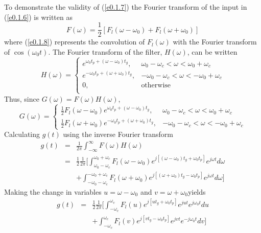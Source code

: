 	To demonstrate the validity of (\ref{e0.1.7}) the Fourier transform
of the input in (\ref{e0.1.6}) is written as
%
\begin{equation}
F(\omega)=\frac{1}{2}[F_l(\omega-\omega_0)+F_l(\omega+\omega_0)]
\label{e0.1.8}
\end{equation}
%
where 
(\ref{e0.1.8}) represents the convolution of $F_l(\omega)$ with
the Fourier transform of $\cos(\omega_0t)$.
The Fourier transform of the filter, $H(\omega)$, can be written
%
\begin{equation}
H(\omega)=\left\{\begin{array}{ll}
 e^{\omega_0t_p+(\omega-\omega_0)t_g},
	&\mbox{$\omega_0-\omega_c<\omega<\omega_0+\omega_c$}\\
 e^{-\omega_0t_p+(\omega+\omega_0)t_g},
	&\mbox{$-\omega_0-\omega_c<\omega<-\omega_0+\omega_c$}\\
 0,
	&\mbox{otherwise}\\
\end{array}\right.
\label{e0.1.9}
\end{equation}
%
Thus, since $G(\omega)=F(\omega)H(\omega)$,
%
\begin{equation}
G(\omega)=\left\{\begin{array}{ll}
\frac{1}{2}F_l(\omega-\omega_0) e^{\omega_0t_p+(\omega-\omega_0)t_g},
	&\mbox{$\omega_0-\omega_c<\omega<\omega_0+\omega_c$}\\
\frac{1}{2}F_l(\omega+\omega_0) e^{-\omega_0t_p+(\omega+\omega_0)t_g},
	&\mbox{$-\omega_0-\omega_c<\omega<-\omega_0+\omega_c$}
\end{array}\right.
\label{e0.1.10}
\end{equation}
%
Calculating $g(t)$ using the inverse Fourier transform
%
\begin{eqnarray}
g(t)&=&\frac{1}{2\pi}\int_{-\infty}^{\infty}F(\omega)H(\omega)\nonumber\\
    &=&\frac{1}{2}\frac{1}{2\pi}[\int_{\omega_0-\omega_c}^{\omega_0+\omega_c}
       F_l(\omega-\omega_0)e^{j[(\omega-\omega_0)t_g+\omega_0t_p]}e^{j\omega t}d\omega\nonumber\\
    && +\int_{-\omega_0-\omega_c}^{-\omega_0+\omega_c}
F_l(\omega+\omega_0)e^{j[(\omega+\omega_0)t_g-\omega_0t_p]}e^{j\omega t}d\omega]
\label{e0.1.11}
\end{eqnarray}
%
Making the change in variables $u=\omega-\omega_0$ and $v=\omega+\omega_0$yields
%
\begin{eqnarray}
g(t)&=&\frac{1}{2}\frac{1}{2\pi}[\int_{-\omega_c}^{\omega_c}
       F_l(u)e^{j[ut_g+\omega_0t_p]}e^{jut}e^{j\omega_0t}du\nonumber\\
    && +\int_{-\omega_c}^{\omega_c}
F_l(v)e^{j[vt_g-\omega_0t_p]}e^{jvt}e^{-j\omega_0 t}dv]
\label{e0.1.12}
\end{eqnarray}
